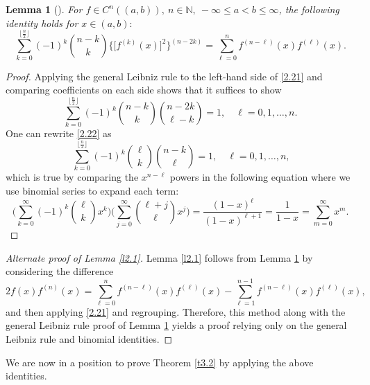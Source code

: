 \documentclass[reqno,10pt,centertags]{amsart}
\newcommand{\bbN}{{\mathbb{N}}}
\numberwithin{equation}{section}
\newtheorem{lemma}[theorem]{Lemma}
\theoremstyle{remark}
\begin{document}
\begin{lemma}[\cite{H24}]\label{l2.4}
For $f\in C^n((a,b)),\ n\in\bbN,\ -\infty\leq a<b\leq\infty$, the following identity holds for $x\in(a,b)$$:$
\begin{equation}\label{2.21}
\sum_{k=0}^{\lfloor \frac{n}{2}\rfloor} (-1)^k \binom{n-k}{k} \big\{\big[f^{(k)}(x)\big]^2\big\}^{(n-2k)}=\sum_{\ell=0}^n f^{(n-\ell)}(x)f^{(\ell)}(x).
\end{equation}
\end{lemma}
\begin{proof}

Applying the general Leibniz rule to the left-hand side of \eqref{2.21} and comparing coefficients on each side shows that it suffices to show
\begin{equation}\label{2.22}
\sum_{k=0}^{\lfloor \frac{n}{2}\rfloor} (-1)^k \binom{n-k}{k}\binom{n-2k}{\ell-k}=1,\quad \ell=0,1,\dots,n.
\end{equation}
One can rewrite \eqref{2.22} as
\begin{equation}\
\sum_{k=0}^{\lfloor \frac{n}{2}\rfloor} (-1)^k \binom{\ell}{k} \binom{n-k}{\ell}=1,\quad \ell=0,1,\dots,n,
\end{equation}
which is true by comparing the $x^{n-\ell}$ powers in the following equation where we use binomial series to expand each term:
\begin{equation}
\bigg(\sum_{k=0}^{\infty}(-1)^k\binom{\ell}{k}x^k\bigg)\bigg(\sum_{j=0}^\infty\binom{\ell+j}{\ell}x^j\bigg)=\frac{(1-x)^{\ell}}{(1-x)^{\ell+1}}=\dfrac{1}{1-x}=\sum_{m=0}^\infty x^m.
\end{equation}
\end{proof}


\begin{proof}[Alternate proof of Lemma \ref{l2.1}]
Lemma \ref{l2.1} follows from Lemma \ref{l2.4} by considering the difference
\begin{equation}
2f(x)f^{(n)}(x)=\sum_{\ell=0}^n f^{(n-\ell)}(x)f^{(\ell)}(x)-\sum_{\ell=1}^{n-1} f^{(n-\ell)}(x)f^{(\ell)}(x),
\end{equation}
and then applying \eqref{2.21} and regrouping. Therefore, this method along with the general Leibniz rule proof of Lemma \ref{l2.4} yields a proof relying only on the general Leibniz rule and binomial identities.
\end{proof}

We are now in a position to prove Theorem \ref{t3.2} by applying the above identities.
\end{document}
